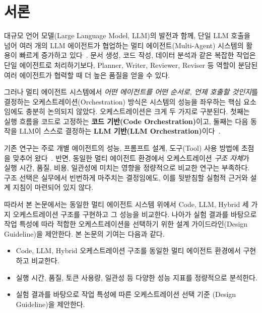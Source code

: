\section{서론}

대규모 언어 모델(Large Language Model, LLM)의 발전과 함께, 단일 LLM
호출을 넘어 여러 개의 LLM 에이전트가 협업하는 멀티 에이전트(Multi-Agent)
시스템의 활용이 빠르게 증가하고 있다~\cite{wang2024survey, wu2023autogen}.
문서 생성, 코드 작성, 데이터 분석과 같은 복잡한 작업은 단일 에이전트로
처리하기보다, Planner, Writer, Reviewer, Reviser 등 역할이 분담된 여러
에이전트가 협력할 때 더 높은 품질을 얻을 수 있다.

그러나 멀티 에이전트 시스템에서 \emph{어떤 에이전트를 어떤 순서로, 언제
호출할 것인지}를 결정하는 오케스트레이션(Orchestration) 방식은 시스템의
성능을 좌우하는 핵심 요소임에도 충분히 논의되지 않았다. 오케스트레이션은
크게 두 가지로 구분된다. 첫째는 실행 흐름을 코드로 고정하는 \textbf{코드
기반(Code Orchestration)}이고, 둘째는 다음 동작을 LLM이 스스로 결정하는
\textbf{LLM 기반(LLM Orchestration)}이다~\cite{langgraph2024, googleadk2025}.

기존 연구는 주로 개별 에이전트의 성능, 프롬프트 설계, 도구(Tool) 사용
방법에 초점을 맞추어 왔다~\cite{hong2024metagpt}. 반면, 동일한 멀티
에이전트 환경에서 오케스트레이션 \emph{구조 자체}가 실행 시간, 품질,
비용, 일관성에 미치는 영향을 정량적으로 비교한 연구는 부족하다. 구조
선택은 실무에서 빈번하게 마주치는 결정임에도, 이를 뒷받침할 실험적 근거와
설계 지침이 마련되어 있지 않다.

따라서 본 논문에서는 동일한 멀티 에이전트 시스템 위에서 Code, LLM,
Hybrid 세 가지 오케스트레이션 구조를 구현하고 그 성능을 비교한다. 나아가
실험 결과를 바탕으로 작업 특성에 따라 적합한 오케스트레이션을 선택하기
위한 설계 가이드라인(Design Guideline)을 제안한다. 본 논문의 기여는 다음과
같다.

\begin{itemize}
  \item Code, LLM, Hybrid 오케스트레이션 구조를 동일한 멀티 에이전트
        환경에서 구현하고 비교한다.
  \item 실행 시간, 품질, 토큰 사용량, 일관성 등 다양한 성능 지표를
        정량적으로 분석한다.
  \item 실험 결과를 바탕으로 작업 특성에 따른 오케스트레이션 선택 기준
        (Design Guideline)을 제안한다.
\end{itemize}
